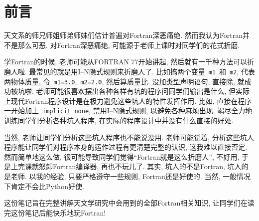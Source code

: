 \chapter*{前言}

天文系的师兄师姐师弟师妹们估计普遍对Fortran深恶痛绝. 然而我认为Fortran并不是那么可恶. 对Fortran深恶痛绝, 可能源于老师上课时对同学们的花式折磨.

学Fortran的时候, 老师可能从FORTRAN 77开始讲起, 然后就有一千种方法可以折磨人啦. 最常见的就是用I--N隐式规则来折磨人了. 比如搞两个变量~\texttt{m1}~和~\texttt{m2}, 代表两物体质量, 令~\texttt{m1=3.0},~\texttt{m2=2.0}, 然后算质量比. 没加类型声明语句, 直接除, 就成功被坑啦. 老师可能很喜欢摆出各种各样有坑的程序问同学们输出是什么, 但实际上现代Fortran程序设计是在极力避免这些坑人的特性发挥作用. 比如, 直接在程序一开始加上~\texttt{implicit none}, 禁用I--N隐式规则, 以避免各种麻烦出现. 竭尽全力地训练同学们分析各种坑人程序, 在实际的程序设计中并没有什么直接的好处.

当然, 老师让同学们分析这些坑人程序也不能说没用. 老师可能觉着, 分析这些坑人程序能让同学们对程序本身的运作过程有更清楚完整的认识, 这我难以直接否定. 然而简单地这么做, 很可能导致同学们觉得``Fortran就是这么折磨人'', 不好用, 于是上完课就怒卸Fortran编译器, 再也不玩儿了. 其实, 坑人的不是Fortran, 坑人的是老师. 以我的经验, 只要严格遵守一些规则, Fortran还是好使的. 当然, 一般情况下肯定不会比Python好使.

这份笔记旨在完整讲解天文学研究中会用到的全部Fortran相关知识, 让同学们在读完这份笔记后能快乐地玩Fortran!
